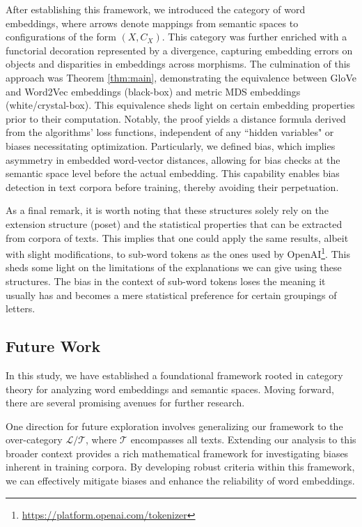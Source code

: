 \documentclass[10pt,a4paper]{elsarticle}
\renewcommand{\L}{\mathcal{L}}
\begin{document}
After establishing this framework, we introduced the category of word embeddings, where arrows denote mappings from semantic spaces to configurations of the form $(X, C_{X})$. This category was further enriched with a functorial decoration represented by a divergence, capturing embedding errors on objects and disparities in embeddings across morphisms. The culmination of this approach was Theorem \ref{thm:main}, demonstrating the equivalence between GloVe and Word2Vec embeddings (black-box) and metric MDS embeddings (white/crystal-box). This equivalence sheds light on certain embedding properties prior to their computation. Notably, the proof yields a distance formula derived from the algorithms' loss functions, independent of any ``hidden variables" or biases necessitating optimization. Particularly, we defined bias, which implies asymmetry in embedded word-vector distances, allowing for bias checks at the semantic space level before the actual embedding. This capability enables bias detection in text corpora before training, thereby avoiding their perpetuation.



As a final remark, it is worth noting that these structures solely rely on the extension structure (poset) and the statistical properties that can be extracted from corpora of texts. This implies that one could apply the same results, albeit with slight modifications, to sub-word tokens as the ones used by OpenAI\footnote{\url{https://platform.openai.com/tokenizer}}. This sheds some light on the limitations of the explanations we can give using these structures. The bias in the context of sub-word tokens loses the meaning it usually has and becomes a mere statistical preference for certain groupings of letters. 




\subsection{Future Work}



In this study, we have established a foundational framework rooted in category theory for analyzing word embeddings and semantic spaces. Moving forward, there are several promising avenues for further research.

One direction for future exploration involves generalizing our framework to the over-category $\L / \mathcal{T}$, where $\mathcal{T}$ encompasses all texts. Extending our analysis to this broader context provides a rich mathematical framework for investigating biases inherent in training corpora. By developing robust criteria within this framework, we can effectively mitigate biases and enhance the reliability of word embeddings.
\end{document}
